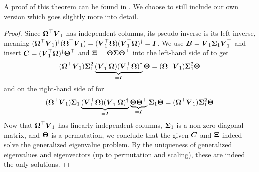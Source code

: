 A proof of this theorem can be found in \cite[theorem~3]{lin2017randomized}. We
choose to still include our own version which goes slightly more into detail.
\begin{proof}
    Since $\boldsymbol{\Omega}^{\top} \boldsymbol{V}_1$ has independent columns, its pseudo-inverse
    is its left inverse, meaning 
    $(\boldsymbol{\Omega}^{\top} \boldsymbol{V}_1)^{\dagger} (\boldsymbol{\Omega}^{\top} \boldsymbol{V}_1) = ( \boldsymbol{V}_1^{\top}\boldsymbol{\Omega}) ( \boldsymbol{V}_1^{\top}\boldsymbol{\Omega})^{\dagger} = \boldsymbol{I}$.
    We use $\boldsymbol{B} = \boldsymbol{V}_1 \boldsymbol{\Sigma}_1 \boldsymbol{V}_1^{\top}$ and insert
    $\boldsymbol{C} = (\boldsymbol{V}_1^{\top} \boldsymbol{\Omega})^{\dagger} \boldsymbol{\Theta}^{\top}$
    and $\boldsymbol{\Xi} = \boldsymbol{\Theta} \boldsymbol{\Sigma} \boldsymbol{\Theta}^{\top}$ into the
    left-hand side of  to get
    \begin{equation}
        (\boldsymbol{\Omega}^{\top} \boldsymbol{V}_1) \boldsymbol{\Sigma}_1^2 \underbrace{(\boldsymbol{V}_1^{\top} \boldsymbol{\Omega}) (\boldsymbol{V}_1^{\top} \boldsymbol{\Omega})^{\dagger}}_{=\boldsymbol{I}} \boldsymbol{\Theta} = (\boldsymbol{\Omega}^{\top} \boldsymbol{V}_1) \boldsymbol{\Sigma}_1^2 \boldsymbol{\Theta}
    \end{equation}
    and on the right-hand side of  for
    \begin{equation}
        (\boldsymbol{\Omega}^{\top} \boldsymbol{V}_1) \boldsymbol{\Sigma}_1 \underbrace{(\boldsymbol{V}_1^{\top} \boldsymbol{\Omega}) (\boldsymbol{V}_1^{\top} \boldsymbol{\Omega})^{\dagger}}_{=\boldsymbol{I}} \underbrace{\boldsymbol{\Theta} \boldsymbol{\Theta}^{\top}}_{=\boldsymbol{I}} \boldsymbol{\Sigma}_1 \boldsymbol{\Theta} = (\boldsymbol{\Omega}^{\top} \boldsymbol{V}_1) \boldsymbol{\Sigma}_1^2 \boldsymbol{\Theta}
    \end{equation}
    Now that $\boldsymbol{\Omega}^{\top} \boldsymbol{V}_1$ has linearly independent columns, $\boldsymbol{\Sigma}_1$ is a non-zero
    diagonal matrix, and $\boldsymbol{\Theta}$ is a permutation, we conclude that
    the given $\boldsymbol{C}$ and $\boldsymbol{\Xi}$ indeed solve the generalized eigenvalue problem.
    By the uniqueness of generalized eigenvalues and eigenvectors (up to
    permutation and scaling), these are indeed the only solutions.


\end{proof}
